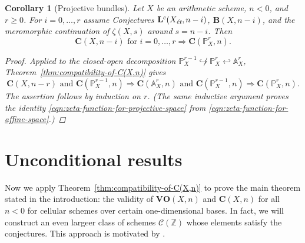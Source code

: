 \documentclass[10pt,a4paper,oneside,draft]{article}
\newcommand{\ZZ}{\mathbb{Z}}
\renewcommand{\AA}{\mathbb{A}}
\newcommand{\PP}{\mathbb{P}}
\newcommand{\et}{\text{\it \'{e}t}}
\theoremstyle{myplain}
\newtheorem{corollary}[theorem]{Corollary}
\theoremstyle{mydefinition}
\numberwithin{equation}{section}
\begin{document}
\begin{corollary}[Projective bundles]
  Let $X$ be an arithmetic scheme, $n < 0$, and $r \ge 0$.
  For $i = 0,\ldots,r$ assume Conjectures $\mathbf{L}^c (X_\et,n-i)$,
  $\mathbf{B} (X,n-i)$, and the meromorphic continuation of $\zeta (X,s)$ around
  $s = n-i$. Then
  \[ \mathbf{C} (X,n-i)\text{ for }i = 0,\ldots,r \Longrightarrow
    \mathbf{C} (\PP_X^r, n). \]

  \begin{proof}
    Applied to the closed-open decomposition
    $\PP_X^{r-1} \not\hookrightarrow \PP_X^r \hookleftarrow \AA_X^r$,
    Theorem~\ref{thm:compatibility-of-C(X,n)} gives
    \[ \mathbf{C} (X, n-r) \text{ and } \mathbf{C} (\PP_X^{r-1}, n)
      \Longrightarrow
      \mathbf{C} (\AA_X^r, n) \text{ and } \mathbf{C} (\PP_X^{r-1}, n)
      \Longrightarrow
      \mathbf{C} (\PP_X^r,n). \]
    The assertion follows by induction on $r$.
    (The same inductive argument proves the identity
    \eqref{eqn:zeta-function-for-projective-space} from
    \eqref{eqn:zeta-function-for-affine-space}.)
    \end{proof}
\end{corollary}


\section{Unconditional results}
\label{sec:unconditional-results}

Now we apply Theorem~\ref{thm:compatibility-of-C(X,n)} to prove the main theorem
stated in the introduction: the validity of $\mathbf{VO} (X,n)$ and
$\mathbf{C} (X,n)$ for all $n < 0$ for cellular schemes over certain
one-dimensional bases. In fact, we will construct an even largeer class of
schemes $\mathcal{C} (\ZZ)$ whose elements satisfy the conjectures. This
approach is motivated by \cite[\S 5]{Morin-2014}.
\end{document}
